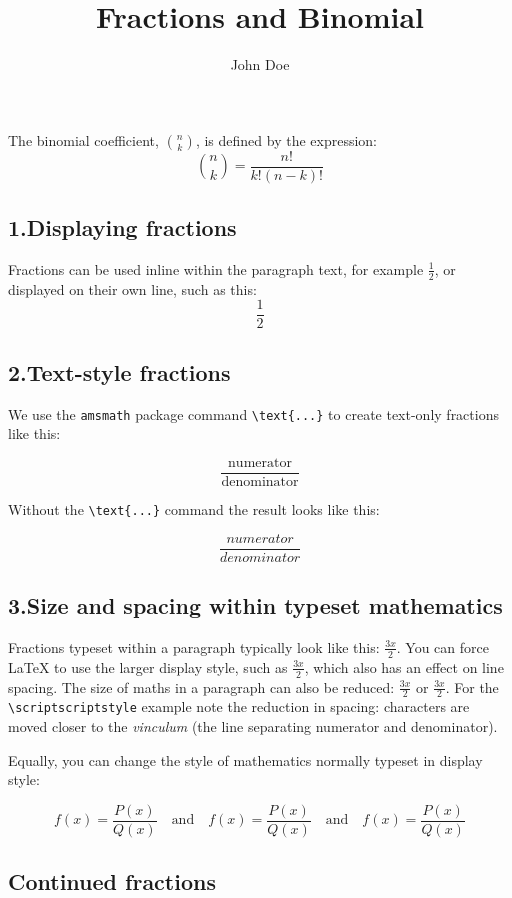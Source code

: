 \documentclass{article}
\title{Fractions and Binomial}
\author{John Doe}
\begin{document}
	\maketitle
The binomial coefficient, \(\binom{n}{k}\), is defined by the expression:
\[
\binom{n}{k} = \frac{n!}{k!(n-k)!}
\]
\subsection*{1.Displaying fractions}
Fractions can be used inline within the paragraph text, for 
example \(\frac{1}{2}\), or displayed on their own line, 
such as this:
\[\frac{1}{2}\]

\subsection*{2.Text-style fractions}

We use the \texttt{amsmath} package command
\verb|\text{...}| to create text-only fractions
like this:

\[\frac{\text{numerator}}{\text{denominator}}\]

Without the \verb|\text{...}| command the result 
looks like this:

\[\frac{numerator}{denominator}\]

\subsection*{3.Size and spacing within typeset mathematics}
Fractions typeset within a paragraph typically look like this: \(\frac{3x}{2}\). You can force \LaTeX{} to use the larger display style, such as \( \displaystyle \frac{3x}{2} \), which also has an effect on line spacing. The size of maths in a paragraph can also be reduced: \(\scriptstyle \frac{3x}{2}\) or \(\scriptscriptstyle \frac{3x}{2}\). For the \verb|\scriptscriptstyle| example note the reduction in spacing: characters are moved closer to the \textit{vinculum} (the line separating numerator and denominator).

Equally, you can change the style of mathematics normally typeset in display style:

\[f(x)=\frac{P(x)}{Q(x)}\quad \textrm{and}\quad \textstyle f(x)=\frac{P(x)}{Q(x)}\quad \textrm{and}\quad \scriptstyle f(x)=\frac{P(x)}{Q(x)}\]

\subsection*{Continued fractions}
\end{document}
